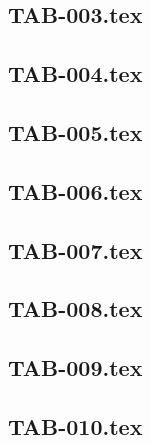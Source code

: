 \renewcommand{\xxexo}{TAB-003.tex} 
\subsection*{\xxexo} 
\graphicspath{{../../exos/tableaux/TAB-003/}}
 
 
\renewcommand{\xxexo}{TAB-004.tex} 
\subsection*{\xxexo} 
\graphicspath{{../../exos/tableaux/TAB-004/}}
 
 
\renewcommand{\xxexo}{TAB-005.tex} 
\subsection*{\xxexo} 
\graphicspath{{../../exos/tableaux/TAB-005/}}
 
 
\renewcommand{\xxexo}{TAB-006.tex} 
\subsection*{\xxexo} 
\graphicspath{{../../exos/tableaux/TAB-006/}}
 
 
\renewcommand{\xxexo}{TAB-007.tex} 
\subsection*{\xxexo} 
\graphicspath{{../../exos/tableaux/TAB-007/}}
 
 
\renewcommand{\xxexo}{TAB-008.tex} 
\subsection*{\xxexo} 
\graphicspath{{../../exos/tableaux/TAB-008/}}
 
 
\renewcommand{\xxexo}{TAB-009.tex} 
\subsection*{\xxexo} 
\graphicspath{{../../exos/tableaux/TAB-009/}}
 
 
\renewcommand{\xxexo}{TAB-010.tex} 
\subsection*{\xxexo} 
\graphicspath{{../../exos/tableaux/TAB-010/}}
 
 
